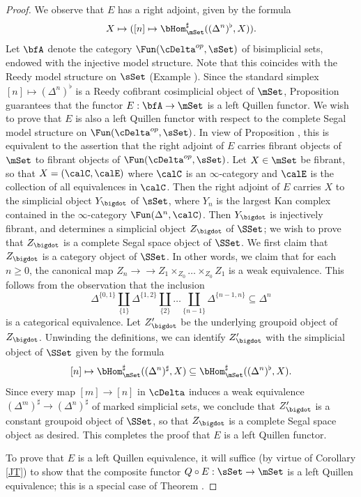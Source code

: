 \begin{proof}
We observe that $E$ has a right adjoint, given by the formula
$$X \mapsto ( [n] \mapsto \bHom_{ \mSet}^{\sharp}( (\Delta^n)^{\flat}, X)).$$
Let $\bfA$ denote the category $\Fun( \cDelta^{op}, \sSet)$ of bisimplicial sets, endowed with
the injective model structure. Note that this coincides with the Reedy model structure on
$\sSet$ (Example ). Since the standard simplex $[n] \mapsto ( \Delta^n)^{\flat}$ is a Reedy cofibrant cosimplicial object of $\mSet$, Proposition  guarantees that
the functor $E: \bfA \rightarrow \mSet$ is a left Quillen functor. We wish to prove that $E$
is also a left Quillen functor with respect to the complete Segal model structure on
$\Fun( \cDelta^{op}, \sSet)$. In view of Proposition , this is equivalent to the assertion
that the right adjoint of $E$ carries fibrant objects of $\mSet$ to fibrant objects of 
$\Fun( \cDelta^{op}, \sSet)$. Let $X \in \mSet$ be fibrant, so that $X = ( \calC, \calE)$ where
$\calC$ is an $\infty$-category and $\calE$ is the collection of all equivalences in $\calC$.
Then the right adjoint of $E$ carries $X$ to the simplicial object $Y_{\bigdot}$ of $\sSet$,
where $Y_{n}$ is the largest Kan complex contained in the $\infty$-category
$\Fun( \Delta^n, \calC)$. Then $Y_{\bigdot}$ is injectively fibrant, and determines
a simplicial object $Z_{\bigdot}$ of $\SSet$; we wish to prove that $Z_{\bigdot}$ is a complete
Segal space object of $\SSet$. We first claim that $Z_{\bigdot}$ is a category object of $\SSet$.
In other words, we claim that for each $n \geq 0$, the canonical map $Z_{n} \rightarrow 
\rightarrow Z_1 \times_{Z_0} \ldots
\times_{Z_0} Z_1$ is a weak equivalence. This follows from the observation that the inclusion
$$ \Delta^{ \{0,1\} } \coprod_{ \{1\} } \Delta^{ \{1,2\} } \coprod_{ \{2\} } \ldots \coprod_{ \{n-1\} }
\Delta^{ \{n-1, n\} } \subseteq \Delta^n$$
is a categorical equivalence. Let $Z'_{\bigdot}$ be the underlying groupoid object of $Z_{\bigdot}$. Unwinding the definitions, we can identify $Z'_{\bigdot}$ with the simplicial object of $\SSet$ given by the formula
$$[n] \mapsto \bHom_{ \mSet}^{\sharp}( (\Delta^n)^{\sharp}, X) \subseteq \bHom_{ \mSet}^{\sharp}( (\Delta^n)^{\flat}, X).$$
Since every map $[m] \rightarrow [n]$ in $\cDelta$ induces a weak equivalence
$(\Delta^{m})^{\sharp} \rightarrow (\Delta^n)^{\sharp}$ of marked simplicial sets, we conclude
that $Z'_{\bigdot}$ is a constant groupoid object of $\SSet$, so that $Z_{\bigdot}$ is a complete Segal space object as desired. This completes the proof that $E$ is a left Quillen functor.

To prove that $E$ is a left Quillen equivalence, it will suffice (by virtue of Corollary \ref{JT}) to show that
the composite functor $Q \circ E: \sSet \rightarrow \mSet$ is a left Quillen equivalence; this is 
a special case of Theorem .
\end{proof}

